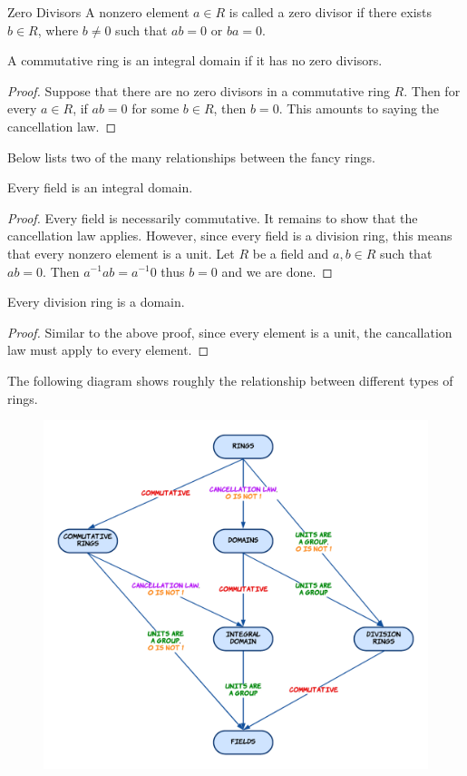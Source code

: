 \documentclass[a4paper]{article}
\begin{document}
\begin{defn}{Zero Divisors}{} A nonzero element $a\in R$ is called a zero divisor if there exists $b\in R$, where $b\neq 0$ such that $ab=0$ or $ba=0$. 
\end{defn}

\begin{prp}{}{} A commutative ring is an integral domain if it has no zero divisors. \tcbline
\begin{proof}
Suppose that there are no zero divisors in a commutative ring $R$. Then for every $a\in R$, if $ab=0$ for some $b\in R$, then $b=0$. This amounts to saying the cancellation law. 
\end{proof}
\end{prp}

Below lists two of the many relationships between the fancy rings. 

\begin{prp}{}{} Every field is an integral domain. \tcbline
\begin{proof}
Every field is necessarily commutative. It remains to show that the cancellation law applies. However, since every field is a division ring, this means that every nonzero element is a unit. Let $R$ be a field and $a,b\in R$ such that $ab=0$. Then $a^{-1}ab=a^{-1}0$ thus $b=0$ and we are done. 
\end{proof}
\end{prp}

\begin{prp}{}{} Every division ring is a domain. \tcbline
\begin{proof}
Similar to the above proof, since every element is a unit, the cancallation law must apply to every element. 
\end{proof}
\end{prp}

The following diagram shows roughly the relationship between different types of rings. 

\begin{figure}[h]
\includegraphics[scale = 0.3]{Ring Diagram}
\centering
\end{figure}
\end{document}
